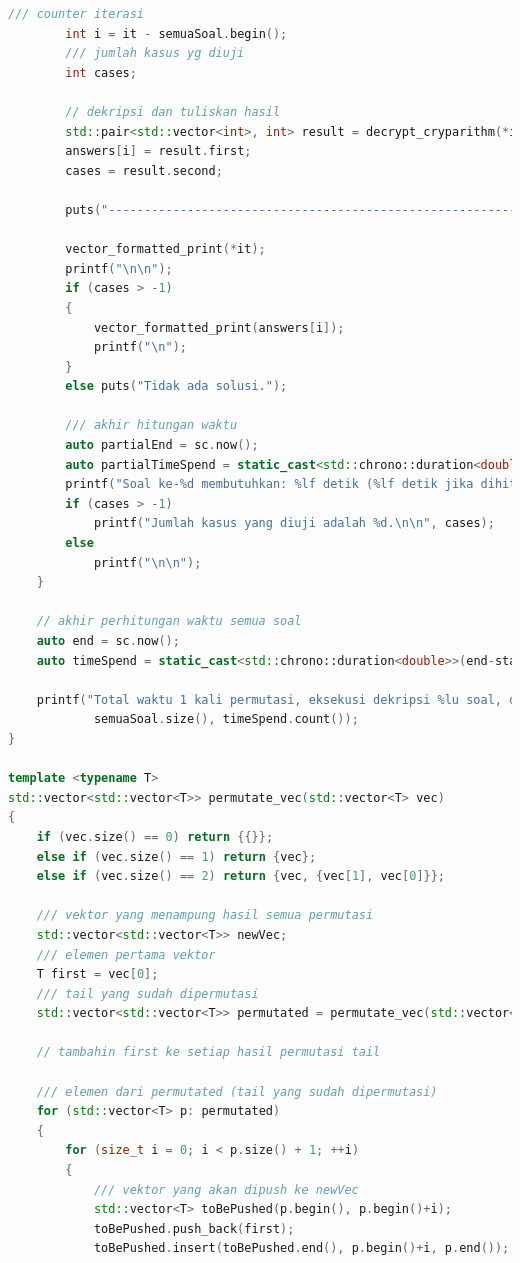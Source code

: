 \documentclass{article}
\begin{document}
\begin{lstlisting}[caption = main.cpp, language = c++]
        /// counter iterasi
        int i = it - semuaSoal.begin();
        /// jumlah kasus yg diuji
        int cases;

        // dekripsi dan tuliskan hasil
        std::pair<std::vector<int>, int> result = decrypt_cryparithm(*it, permutatedNumbers);
        answers[i] = result.first;
        cases = result.second;

        puts("-------------------------------------------------------------");

        vector_formatted_print(*it);
        printf("\n\n");
        if (cases > -1)
        {
            vector_formatted_print(answers[i]);
            printf("\n");
        }
        else puts("Tidak ada solusi.");

        /// akhir hitungan waktu
        auto partialEnd = sc.now();
        auto partialTimeSpend = static_cast<std::chrono::duration<double>>(partialEnd-partialStart);
        printf("Soal ke-%d membutuhkan: %lf detik (%lf detik jika dihitung dengan waktu permutasi).\n", i+1, partialTimeSpend.count(), partialTimeSpend.count() + permTS.count());
        if (cases > -1)
            printf("Jumlah kasus yang diuji adalah %d.\n\n", cases);
        else
            printf("\n\n");
    }

    // akhir perhitungan waktu semua soal
    auto end = sc.now();
    auto timeSpend = static_cast<std::chrono::duration<double>>(end-start);

    printf("Total waktu 1 kali permutasi, eksekusi dekripsi %lu soal, dan menuliskan output adalah %lf detik.\n",
            semuaSoal.size(), timeSpend.count());
}

template <typename T>
std::vector<std::vector<T>> permutate_vec(std::vector<T> vec)
{
    if (vec.size() == 0) return {{}};
    else if (vec.size() == 1) return {vec};
    else if (vec.size() == 2) return {vec, {vec[1], vec[0]}};

    /// vektor yang menampung hasil semua permutasi
    std::vector<std::vector<T>> newVec;
    /// elemen pertama vektor
    T first = vec[0];
    /// tail yang sudah dipermutasi
    std::vector<std::vector<T>> permutated = permutate_vec(std::vector<T>(vec.begin()+1, vec.end()));

    // tambahin first ke setiap hasil permutasi tail

    /// elemen dari permutated (tail yang sudah dipermutasi)
    for (std::vector<T> p: permutated)
    {
        for (size_t i = 0; i < p.size() + 1; ++i)
        {
            /// vektor yang akan dipush ke newVec
            std::vector<T> toBePushed(p.begin(), p.begin()+i);
            toBePushed.push_back(first);
            toBePushed.insert(toBePushed.end(), p.begin()+i, p.end());


\end{lstlisting}
\end{document}
